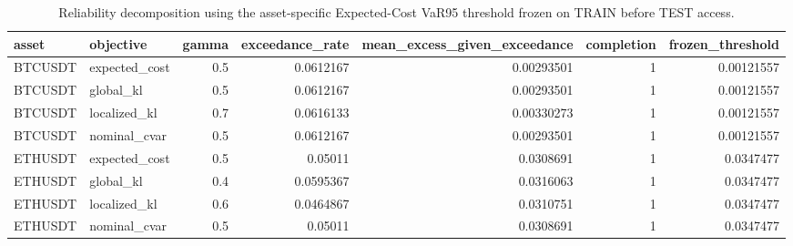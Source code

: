 \begin{table}[!htbp]
\centering
\caption{Reliability decomposition using the asset-specific Expected-Cost VaR95 threshold frozen on TRAIN before TEST access.}
\label{tab:i7_reliability}
\small
\begin{tabular}{llrrrrr}
\toprule
asset & objective & gamma & exceedance\_rate & mean\_excess\_given\_exceedance & completion & frozen\_threshold \\
\midrule
BTCUSDT & expected\_cost & 0.5 & 0.0612167 & 0.00293501 & 1 & 0.00121557 \\
BTCUSDT & global\_kl & 0.5 & 0.0612167 & 0.00293501 & 1 & 0.00121557 \\
BTCUSDT & localized\_kl & 0.7 & 0.0616133 & 0.00330273 & 1 & 0.00121557 \\
BTCUSDT & nominal\_cvar & 0.5 & 0.0612167 & 0.00293501 & 1 & 0.00121557 \\
ETHUSDT & expected\_cost & 0.5 & 0.05011 & 0.0308691 & 1 & 0.0347477 \\
ETHUSDT & global\_kl & 0.4 & 0.0595367 & 0.0316063 & 1 & 0.0347477 \\
ETHUSDT & localized\_kl & 0.6 & 0.0464867 & 0.0310751 & 1 & 0.0347477 \\
ETHUSDT & nominal\_cvar & 0.5 & 0.05011 & 0.0308691 & 1 & 0.0347477 \\
\bottomrule
\end{tabular}
\end{table}
